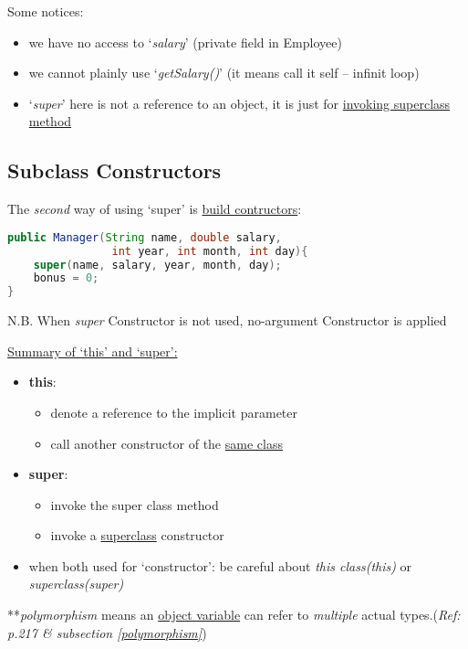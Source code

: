 \documentclass[12pt]{article}
\begin{document}
Some notices:
\begin{itemize}
    \item we have no access to `\textit{salary}' (private field in Employee)
    \item we cannot plainly use `\textit{getSalary()}' (it means call it self -- infinit loop)
    \item `\textit{super}' here is not a reference to an object,\newline
     it is just for \underline{invoking superclass method}  
\end{itemize}

\subsection{Subclass Constructors}
The \textit{second} way of using `super' is \underline{build contructors}:
\begin{lstlisting}[language=Java]
public Manager(String name, double salary, 
                int year, int month, int day){
    super(name, salary, year, month, day);
    bonus = 0;
}
\end{lstlisting}

N.B. When \emph{super} Constructor is not used, no-argument Constructor is applied

\underline{Summary of `this' and `super':}
\begin{itemize}
    \item \textbf{this}:
    \begin{itemize}
        \item denote a reference to the implicit parameter
        \item call another constructor of the \underline{same class}
    \end{itemize}
    \item \textbf{super}:
    \begin{itemize}
        \item invoke the super class method
        \item invoke a \underline{superclass} constructor
    \end{itemize}
    \item when both used for `constructor': be careful about \textit{this class(this)} or \textit{superclass(super)}
\end{itemize}

**\emph{polymorphism} means an \underline{object variable} can refer to \textit{multiple} actual types.(\textit{Ref: p.217 \& subsection \ref{polymorphism}})
\end{document}
